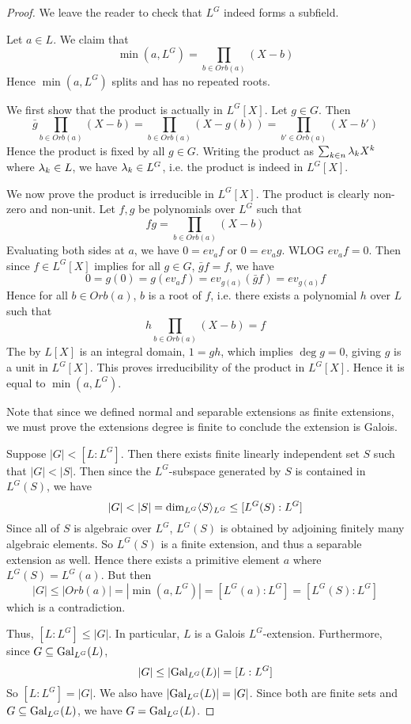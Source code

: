 \documentclass[../book.tex]{subfiles}
\begin{document}
\begin{proof}
    We leave the reader to check that $L^G$ indeed forms a subfield. 

    Let $a \in L$. We claim that \[
        \min(a,L^G) = \prod_{b \in Orb(a)} (X - b)
    \]
    Hence $\min(a,L^G)$ splits and has no repeated roots. 
    
    We first show that the product is actually in $L^G[X]$. 
    Let $g \in G$. Then \[
        \bar{g} \prod_{b \in Orb(a)} (X - b) 
        = \prod_{b \in Orb(a)} (X - g(b)) = \prod_{b' \in Orb(a)} (X - b')
    \]
    Hence the product is fixed by all $g \in G$. 
    Writing the product as $\sum_{k\in n} \lambda_k X^k$ where $\lambda_k \in L$,
    we have $\lambda_k \in L^G$, i.e. the product is indeed in $L^G[X]$. 
    
    We now prove the product is irreducible in $L^G[X]$.
    The product is clearly non-zero and non-unit. 
    Let $f, g$ be polynomials over $L^G$ such that \[
        fg = \prod_{b \in Orb(a)} (X - b)
    \]
    Evaluating both sides at $a$, we have $0 = ev_a f$ or $0 = ev_a g$. 
    WLOG $ev_a f = 0$. 
    Then since $f \in L^G[X]$ implies for all $g \in G$, $\bar{g}f = f$, 
    we have \[
        0 = g(0) = g(ev_a f) = ev_{g(a)}(\bar{g} f) = ev_{g(a)} f
    \]
    Hence for all $b \in Orb(a)$, $b$ is a root of $f$, i.e.
    there exists a polynomial $h$ over $L$ such that \[
        h \prod_{b \in Orb(a)} (X - b) = f
    \]
    The by $L[X]$ is an integral domain, $1 = gh$,
    which implies $\deg g = 0$, giving $g$ is a unit in $L^G[X]$. 
    This proves irreducibility of the product in $L^G[X]$. 
    Hence it is equal to $\min(a,L^G)$. 
    
    Note that since we defined normal and separable extensions as finite extensions,
    we must prove the extensions degree is finite to conclude the extension is Galois.
    
    Suppose $|G| < [L : L^G]$. 
    Then there exists finite linearly independent set $S$ such that $|G| < |S|$. 
    Then since the $L^G$-subspace generated by $S$ is contained in $L^G(S)$, we have 
    \[ |G| < |S| = \dim_{L^G} \langle S\rangle_{L^G} \leq [L^G(S) : L^G] \]
    Since all of $S$ is algebraic over $L^G$, 
    $L^G(S)$ is obtained by adjoining finitely many algebraic elements.
    So $L^G(S)$ is a finite extension, and thus a separable extension as well. 
    Hence there exists a primitive element $a$ where $L^G(S) = L^G(a)$. 
    But then \[
        |G| \leq |Orb(a)| = |\min(a,L^G)| = [L^G(a) : L^G] = [L^G(S) : L^G]
    \]
    which is a contradiction. 
    
    Thus, $[L : L^G] \leq |G|$. In particular, $L$ is a Galois $L^G$-extension.
    Furthermore, since $G \subseteq \text{Gal}_{L^G}(L)$, \[
        |G| \leq |\text{Gal}_{L^G}(L)| = [L : L^G] 
    \]
    So $[L : L^G] = |G|$. 
    We also have $|\text{Gal}_{L^G}(L)| = |G|$. 
    Since both are finite sets and $G \subseteq \text{Gal}_{L^G}(L)$,
    we have $G = \text{Gal}_{L^G}(L)$. 
\end{proof}
\end{document}
